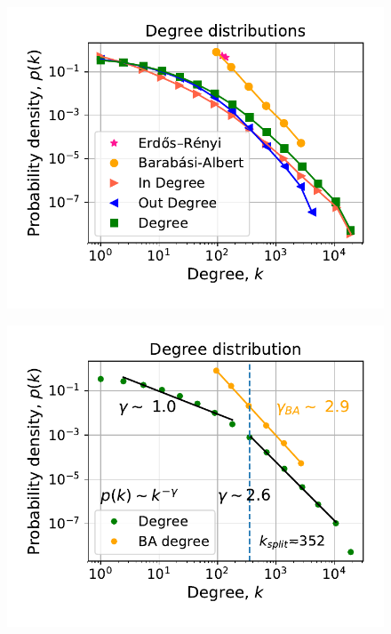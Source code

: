 \documentclass[11pt, twoside]{report}
\begin{document}
 
\begin{minipage}[b]{0.5\textwidth}
   \centering
    \begin{figure}[H]
      \includegraphics[width=\textwidth]{../../scripts/network_analysis/imgs/degree_distributions.pdf}            
          \caption{}
        \label{fig:in_degree}
\end{figure}
\end{minipage}
\begin{minipage}[b]{0.5\textwidth}
  \begin{figure}[H]
  \centering
  \includegraphics[width=\textwidth]{../../scripts/network_analysis/imgs/tot_degree_distribution.pdf}            
        \caption{}
\label{fig:out_degree}
\end{figure}
\end{minipage}
    
\end{document}
